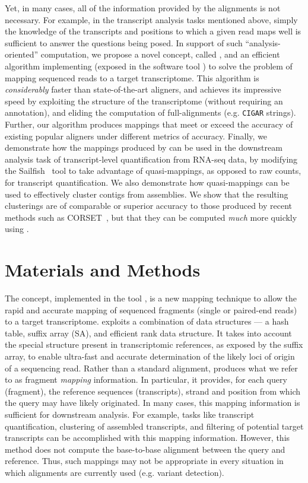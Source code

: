 Yet, in many cases, all of the information provided by the alignments is not necessary.  For example, in the transcript analysis tasks mentioned above, simply the knowledge of the transcripts and positions to which a given read maps well is sufficient to answer the questions being posed. In support of such ``analysis-oriented'' computation, we propose a novel concept, called \qm, and an efficient algorithm implementing \qm (exposed in the software tool \rapmap) to solve the problem of mapping sequenced reads to a target transcriptome. This algorithm is \textit{considerably} faster than state-of-the-art aligners, and achieves its impressive speed by exploiting the structure of the transcriptome (without requiring an annotation), and eliding the computation of full-alignments (e.g. \texttt{CIGAR} strings). Further, our algorithm produces mappings that meet or exceed the accuracy of existing popular aligners under different metrics of accuracy.  Finally, we demonstrate how the mappings produced by \rapmap can be used in the downstream analysis task of transcript-level quantification from RNA-seq data, by modifying the Sailfish~\citep{patro2014sailfish} tool to take advantage of quasi-mappings, as opposed to raw \kmer counts, for transcript quantification. We also demonstrate how quasi-mappings can be used to effectively cluster contigs from \denovo assemblies.  We show that the resulting clusterings are of comparable or superior accuracy to those produced by recent methods such as CORSET~\citep{corset}, but that they can be computed \textit{much} more quickly using \qm.

\vspace{-0.25in}
\section{Materials and Methods} \label{sec:methods}

The \qm concept, implemented in the tool \rapmap, is a new mapping technique to allow the rapid and accurate mapping of sequenced fragments (single or paired-end reads) to a target transcriptome.  \rapmap exploits a combination of data structures --- a hash table, suffix array (SA), and efficient rank data structure.  It takes into account the special structure present in transcriptomic references, as exposed by the suffix array, to enable ultra-fast and accurate determination of the likely loci of origin of a sequencing read.  Rather than a standard alignment, \qm produces what we refer to as fragment \textit{mapping} information. In particular, it provides, for each query (fragment), the reference sequences (transcripts), strand and position from which the query may have likely originated.  In many cases, this mapping information is sufficient for downstream analysis. For example, tasks like transcript quantification, clustering of \denovo assembled transcripts, and filtering of potential target transcripts can be accomplished with this mapping information.  However, this method does not compute the base-to-base alignment between the query and reference.  Thus, such mappings may not be appropriate in every situation in which alignments are currently used (e.g. variant detection).

